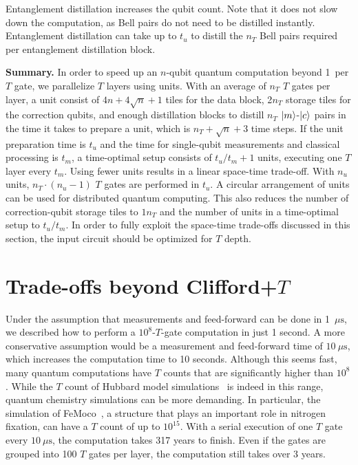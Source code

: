 \documentclass[prx,aps,letterpaper,twocolumn,allowfontchageintitle=true,accepted=2019-02-01]{quantumarticle}
\begin{document}
Entanglement distillation increases the qubit count. Note that it does not slow down the computation, as Bell pairs do not need to be distilled instantly. Entanglement distillation can take up to $t_u$ to distill the $n_T$ Bell pairs required per entanglement distillation block.





\textbf{Summary.}
In order to speed up an $n$-qubit quantum computation beyond 1\clock \ per $T$ gate, we parallelize $T$ layers using units. With an average of $n_T$ $T$ gates per layer, a unit consist of $4n+4\sqrt{n}+1$ tiles for the data block, 2$n_T$ storage tiles for the correction qubits, and enough distillation blocks to distill $n_T$ $\ket{m}$-$\ket{c}$ pairs in the time it takes to prepare a unit, which is $n_T + \sqrt{n}+3$ time steps. If the unit preparation time is $t_u$ and the time for single-qubit measurements and classical processing is $t_m$, a time-optimal setup consists of $t_u/t_m+1$ units, executing one $T$ layer every $t_m$. Using fewer units results in a linear space-time trade-off. With $n_u$ units, $n_T \cdot (n_u-1)$ $T$ gates are performed in $t_u$. A circular arrangement of units can be used for distributed quantum computing. This also reduces the number of correction-qubit storage tiles to $1n_T$ and the number of units in a time-optimal setup to $t_u/t_m$. In order to fully exploit the space-time trade-offs discussed in this section, the input circuit should be optimized for $T$ depth.



\section{Trade-offs beyond Clifford+$T$}
\label{sec:beyond}





Under the assumption that measurements and feed-forward can be done in 1~$\mu\mathrm{s}$, we described how to perform a $10^8$-$T$-gate computation in just 1 second. A more conservative assumption would be a measurement and feed-forward time of $10~\mu\mathrm{s}$, which increases the computation time to 10 seconds. Although this seems fast, many quantum computations have $T$ counts that are significantly higher than $10^8$. While the $T$ count of Hubbard model simulations~\cite{Babbush2018} is indeed in this range, quantum chemistry simulations can be more demanding. In particular, the simulation of FeMoco~\cite{Reiher2017}, a structure that plays an important role in nitrogen fixation, can have a $T$ count of up to $10^{15}$. With a serial execution of one $T$ gate every $10~\mu\mathrm{s}$, the computation takes 317 years to finish. Even if the gates are grouped into 100 $T$ gates per layer, the computation still takes over 3 years.
\end{document}
